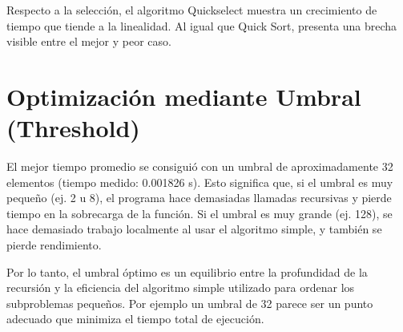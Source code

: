 Respecto a la selección, el algoritmo Quickselect muestra un crecimiento de tiempo que tiende a la linealidad. Al igual que Quick Sort, presenta una brecha visible entre el mejor y peor caso.

\section{Optimización mediante Umbral (Threshold)}
El mejor tiempo promedio se consiguió con un umbral de aproximadamente 32 elementos (tiempo medido: 0.001826 s). Esto significa que, si el umbral es muy pequeño (ej. 2 u 8), el programa hace demasiadas llamadas recursivas y pierde tiempo en la sobrecarga de la función. Si el umbral es muy grande (ej. 128), se hace demasiado trabajo localmente al usar el algoritmo simple, y también se pierde rendimiento.

Por lo tanto, el umbral óptimo es un equilibrio entre la profundidad de la recursión y la eficiencia del algoritmo simple utilizado para ordenar los subproblemas pequeños. Por ejemplo un umbral de 32 parece ser un punto adecuado que minimiza el tiempo total de ejecución.
